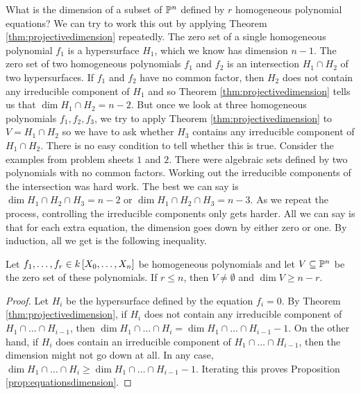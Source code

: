 What is the dimension of a subset of $ \mathbb{P}^n $ defined by $ r $ homogeneous polynomial equations? We can try to work this out by applying Theorem \ref{thm:projectivedimension} repeatedly. The zero set of a single homogeneous polynomial $ f_1 $ is a hypersurface $ H_1 $, which we know has dimension $ n - 1 $. The zero set of two homogeneous polynomials $ f_1 $ and $ f_2 $ is an intersection $ H_1 \cap H_2 $ of two hypersurfaces. If $ f_1 $ and $ f_2 $ have no common factor, then $ H_2 $ does not contain any irreducible component of $ H_1 $ and so Theorem \ref{thm:projectivedimension} tells us that $ \dim H_1 \cap H_2 = n - 2 $. But once we look at three homogeneous polynomials $ f_1, f_2, f_3 $, we try to apply Theorem \ref{thm:projectivedimension} to $ V = H_1 \cap H_2 $ so we have to ask whether $ H_3 $ contains any irreducible component of $ H_1 \cap H_2 $. There is no easy condition to tell whether this is true. Consider the examples from problem sheets $ 1 $ and $ 2 $. There were algebraic sets defined by two polynomials with no common factors. Working out the irreducible components of the intersection was hard work. The best we can say is $ \dim H_1 \cap H_2 \cap H_3 = n - 2 $ or $ \dim H_1 \cap H_2 \cap H_3 = n - 3 $. As we repeat the process, controlling the irreducible components only gets harder. All we can say is that for each extra equation, the dimension goes down by either zero or one. By induction, all we get is the following inequality.

\pagebreak

\begin{proposition}
\label{prop:equationsdimension}
Let $ f_1, \dots, f_r \in k\sbr{X_0, \dots, X_n} $ be homogeneous polynomials and let $ V \subseteq \mathbb{P}^n $ be the zero set of these polynomials. If $ r \le n $, then $ V \ne \emptyset $ and $ \dim V \ge n - r $.
\end{proposition}

\begin{proof}
Let $ H_i $ be the hypersurface defined by the equation $ f_i = 0 $. By Theorem \ref{thm:projectivedimension}, if $ H_i $ does not contain any irreducible component of $ H_1 \cap \dots \cap H_{i - 1} $, then $ \dim H_1 \cap \dots \cap H_i = \dim H_1 \cap \dots \cap H_{i - 1} - 1 $. On the other hand, if $ H_i $ does contain an irreducible component of $ H_1 \cap \dots \cap H_{i - 1} $, then the dimension might not go down at all. In any case, $ \dim H_1 \cap \dots \cap H_i \ge \dim H_1 \cap \dots \cap H_{i - 1} - 1 $. Iterating this proves Proposition \ref{prop:equationsdimension}.
\end{proof}

